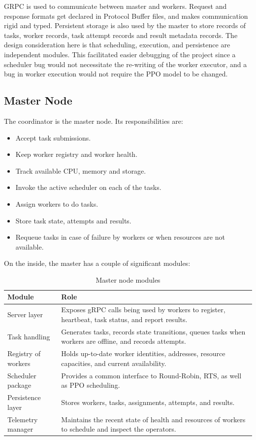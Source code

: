 GRPC is used to communicate between master and workers. Request and response formats get declared in Protocol Buffer files, and makes communication rigid and typed. Persistent storage is also used by the master to store records of tasks, worker records, task attempt records and result metadata records. The design consideration here is that scheduling, execution, and persistence are independent modules. This facilitated easier debugging of the project since a scheduler bug would not necessitate the re-writing of the worker executor, and a bug in worker execution would not require the PPO model to be changed.

\subsection{Master Node}

The coordinator is the master node. Its responsibilities are:

\begin{itemize}
    \item Accept task submissions.
    \item Keep worker registry and worker health.
    \item Track available CPU, memory and storage.
    \item Invoke the active scheduler on each of the tasks.
    \item Assign workers to do tasks.
    \item Store task state, attempts and results.
    \item Requeue tasks in case of failure by workers or when resources are not available.
\end{itemize}

On the inside, the master has a couple of significant modules:

\begin{table}[H]
\centering
\caption{Master node modules}
\label{tab:master_modules}
\begin{tabularx}{\textwidth}{lX}
\toprule
\textbf{Module} & \textbf{Role} \\
\midrule
Server layer & Exposes gRPC calls being used by workers to register, heartbeat, task status, and report results. \\
Task handling & Generates tasks, records state transitions, queues tasks when workers are offline, and records attempts. \\
Registry of workers & Holds up-to-date worker identities, addresses, resource capacities, and current availability. \\
Scheduler package & Provides a common interface to Round-Robin, RTS, as well as PPO scheduling. \\
Persistence layer & Stores workers, tasks, assignments, attempts, and results. \\
Telemetry manager & Maintains the recent state of health and resources of workers to schedule and inspect the operators. \\
\bottomrule
\end{tabularx}
\end{table}

